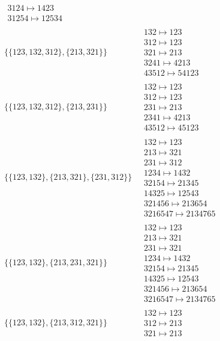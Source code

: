 \begin{scriptsize}
\begin{align}
\begin{matrix}
3124 \mapsto 1423
\\
31254 \mapsto 12534
\end{matrix}
\\
\{\{123, 132, 312\}, \{213, 321\}\}
\ 
&
\begin{matrix}
132 \mapsto 123
\\
312 \mapsto 123
\\
321 \mapsto 213
\\
3241 \mapsto 4213
\\
43512 \mapsto 54123
\end{matrix}
\\
\{\{123, 132, 312\}, \{213, 231\}\}
\ 
&
\begin{matrix}
132 \mapsto 123
\\
312 \mapsto 123
\\
231 \mapsto 213
\\
2341 \mapsto 4213
\\
43512 \mapsto 45123
\end{matrix}
\\
\{\{123, 132\}, \{213, 321\}, \{231, 312\}\}
\ 
&
\begin{matrix}
132 \mapsto 123
\\
213 \mapsto 321
\\
231 \mapsto 312
\\
1234 \mapsto 1432
\\
32154 \mapsto 21345
\\
14325 \mapsto 12543
\\
321456 \mapsto 213654
\\
3216547 \mapsto 2134765
\end{matrix}
\\
\{\{123, 132\}, \{213, 231, 321\}\}
\ 
&
\begin{matrix}
132 \mapsto 123
\\
213 \mapsto 321
\\
231 \mapsto 321
\\
1234 \mapsto 1432
\\
32154 \mapsto 21345
\\
14325 \mapsto 12543
\\
321456 \mapsto 213654
\\
3216547 \mapsto 2134765
\end{matrix}
\\
\{\{123, 132\}, \{213, 312, 321\}\}
\ 
&
\begin{matrix}
132 \mapsto 123
\\
312 \mapsto 213
\\
321 \mapsto 213

\end{matrix}
\end{align}
\end{scriptsize}
